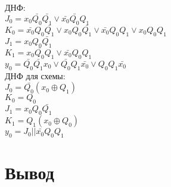 \documentclass[a4paper,10pt]{article}
\begin{document}
		ДНФ: \\
		$J_0 = x_0 \bar{Q_0} \bar{Q_1} \lor \bar{x_0} \bar{Q_0} Q_1$ \\
		$K_0 = \bar{x_0} Q_0 \bar{Q_1} \lor x_0 Q_0 \bar{Q_1} \lor \bar{x_0} Q_0 Q_1 \lor x_0 Q_0 Q_1$ \\
		$J_1 = x_0 Q_0 \bar{Q_1}$ \\
		$K_1 = x_0 \bar{Q_0} Q_1 \lor \bar{x_0} Q_0 Q_1$ \\ 
    	$y_0 = \bar{Q_0} \bar{Q_1} x_0 \lor \bar{Q_0} Q_1 \bar{x_0} \lor Q_0 Q_1 \bar{x_0}$ \\

		ДНФ для схемы: \\
		$J_0 = \bar{Q_0} (x_0 \oplus Q_1)$ \\
		$K_0 = Q_0$ \\
		$J_1 = x_0 Q_0 \bar{Q_1}$ \\
		$K_1 = Q_1 (x_0 \oplus Q_0)$\\
		$y_0 = J_0 || \bar{x_0} Q_0 Q_1$
\section*{Вывод}
\end{document}

